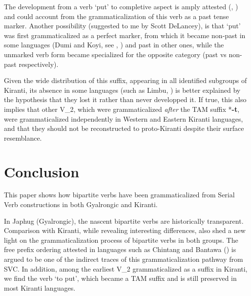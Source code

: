 \documentclass[oneside,a4paper,11pt]{article}
\newcommand{\ipa}[1]{{\phon\textbf{#1}}}
\begin{document}
The development from a verb `put' to completive aspect is amply attested (\citealt[58]{bybee94TAM}, \citealt[248]{heine-kuteva02}) and could account from the grammaticalization of this verb as a past tense marker. Another possibility (suggested to me by Scott DeLancey), is that `put' was first grammaticalized as a perfect marker, from which it became non-past in some languages (Dumi and Koyi, see \citealt{driem93dumi}, \citealt{lahaussois09}) and past in other ones, while the unmarked verb form became specialized for the opposite category (past vs non-past respectively).

Given the wide distribution of this suffix, appearing in all identified subgroups of Kiranti, its absence in some languages (such as Limbu, \citealt{driem87}) is better explained by the hypothesis that they lost it rather than never developped it. If true, this also implies that other V_2, which were grammaticalized \textit{after} the TAM suffix *\ipa{-t}, were grammaticalized independently in Western and Eastern Kiranti languages, and that they should not be reconstructed to proto-Kiranti despite their surface resemblance.

\section*{Conclusion}
This paper shows how bipartite verbs have been grammaticalized from Serial Verb constructions in both Gyalrongic and Kiranti. 

In Japhug (Gyalrongic), the nascent bipartite verbs are historically transparent. Comparison with  Kiranti, while revealing interesting differences, also shed a new light on the grammaticalization process of bipartite verbs in both groups. The free prefix ordering attested in languages such as Chintang and Bantawa (\citealt{bickel07chintang}) is argued to be one of the indirect traces of this grammaticalization pathway from SVC. In addition, among the earliest V_2 grammaticalized as a suffix in Kiranti, we find the verb `to put', which became a TAM suffix and is still preserved in most Kiranti languages.




 
\end{document}
